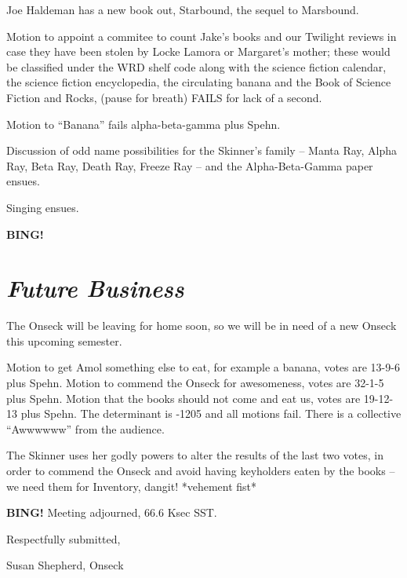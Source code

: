 \documentclass[10pt]{article}
\newcommand{\bing}{{\bf BING!} }
\newcommand{\goto}[1]{\bing \vskip 12pt \section*{{\em{#1}}}}
\newcommand{\ps}{ plus Spehn\xspace}
\newcommand{\onseck}{Susan Shepherd, Onseck}
\begin{document}
Joe Haldeman has a new book out, Starbound, the sequel to Marsbound.

Motion to appoint a commitee to count Jake's books and our Twilight reviews in case they have been stolen by Locke Lamora or Margaret's mother; these would be classified under the WRD shelf code along with the science fiction calendar, the science fiction encyclopedia, the circulating banana and the Book of Science Fiction and Rocks, (pause for breath) FAILS for lack of a second.

Motion to ``Banana'' fails alpha-beta-gamma\ps.

Discussion of odd name possibilities for the Skinner's family -- Manta Ray, Alpha Ray, Beta Ray, Death Ray, Freeze Ray -- and the Alpha-Beta-Gamma paper ensues.

Singing ensues.

\goto{Future Business}

The Onseck will be leaving for home soon, so we will be in need of a new Onseck this upcoming semester.

Motion to get Amol something else to eat, for example a banana, votes are 13-9-6\ps.
Motion to commend the Onseck for awesomeness, votes are 32-1-5\ps.
Motion that the books should not come and eat us, votes are 19-12-13\ps.
The determinant is -1205 and all motions fail. There is a collective ``Awwwwww'' from the audience.

The Skinner uses her godly powers to alter the results of the last two votes, in order to commend the Onseck and avoid having keyholders eaten by the books -- we need them for Inventory, dangit! *vehement fist*

\bing
\noindent
Meeting adjourned, 66.6 Ksec SST.

\vspace{18pt}

\centerline{Respectfully submitted,}
\centerline{\onseck}
\end{document}
